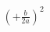 \documentclass[preview]{standalone}
\begin{document}
\begin{align*}
\left(+\frac{b}{2a}\right)^2
\end{align*}
\end{document}
